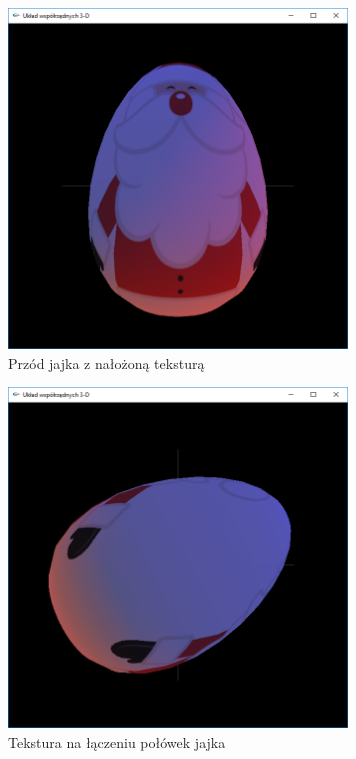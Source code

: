 \documentclass[12pt,a4paper,titlepage]{article}
\begin{document}
\begin{figure}[H]
\centering
\includegraphics[width = 9cm]{images/santa.png}
\caption{Przód jajka z nałożoną teksturą}
\label{fig:mikolaj_przod}
\end{figure}

\begin{figure}[H]
\centering
\includegraphics[width = 9cm]{images/santa1.png}
\caption{Tekstura na łączeniu połówek jajka}
\label{fig:mikolaj_bok}
\end{figure}
\end{document}
